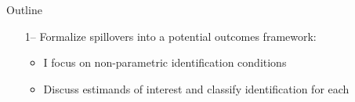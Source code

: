 \documentclass[aspectratio=169,t]{beamer}
\begin{document}
\begin{frame}{Outline}

    \begin{itemize}
        \item[1--] Formalize spillovers into a potential outcomes framework:
 
        \begin{citecolor}
        \end{citecolor}

        \begin{itemize}
            \vspace{2.5mm}
            \item I focus on non-parametric identification conditions
            
            \vspace{2.5mm}
            \item Discuss estimands of interest and classify identification for each
        \end{itemize} 

    \end{itemize}
\end{frame}
\end{document}
